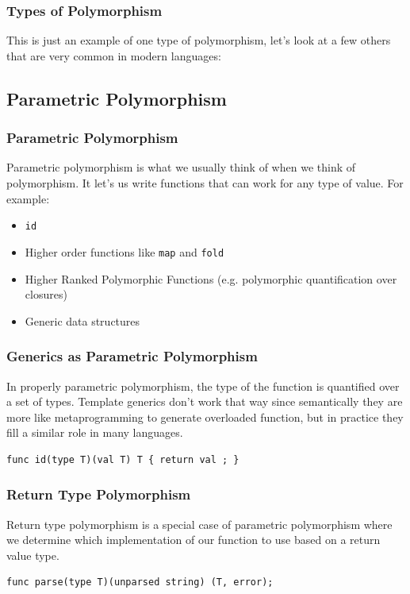 \documentclass{beamer}
\begin{document}
\begin{frame}
  \frametitle{Types of Polymorphism}
  This is just an example of one type of polymorphism, let's look at a
  few others that are very common in modern languages:
\end{frame}

\subsection{Parametric  Polymorphism}

\begin{frame}
  \frametitle{Parametric Polymorphism}
  Parametric polymorphism is what we usually think of when we think of
  polymorphism.  It let's us write functions that can work for any
  type of value.  For example:
  \pause
  \begin{itemize}
  \item \texttt{id}
    \pause
  \item Higher order functions like \texttt{map} and \texttt{fold}
    \pause
  \item Higher Ranked Polymorphic Functions (e.g. polymorphic quantification over closures)
    \pause
  \item Generic data structures
  \end{itemize}
\end{frame}

\begin{frame}[fragile]
  \frametitle{Generics as Parametric Polymorphism}
  In properly parametric polymorphism, the type of the function is
  quantified over a set of types.  Template generics don't work that
  way since semantically they are more like metaprogramming to
  generate overloaded function, but in practice they fill a similar
  role in many languages.
  \begin{center}
\begin{lstlisting}[language=Golang]
func id(type T)(val T) T { return val ; }
\end{lstlisting}
  \end{center}
\end{frame}

\begin{frame}[fragile]
  \frametitle{Return Type Polymorphism}
  Return type polymorphism is a special case of parametric
  polymorphism where we determine which implementation of our function
  to use based on a return value type.
  \begin{center}
\begin{lstlisting}[language=Golang]
func parse(type T)(unparsed string) (T, error);
\end{lstlisting}
    \end{center}
\end{frame}
\end{document}
